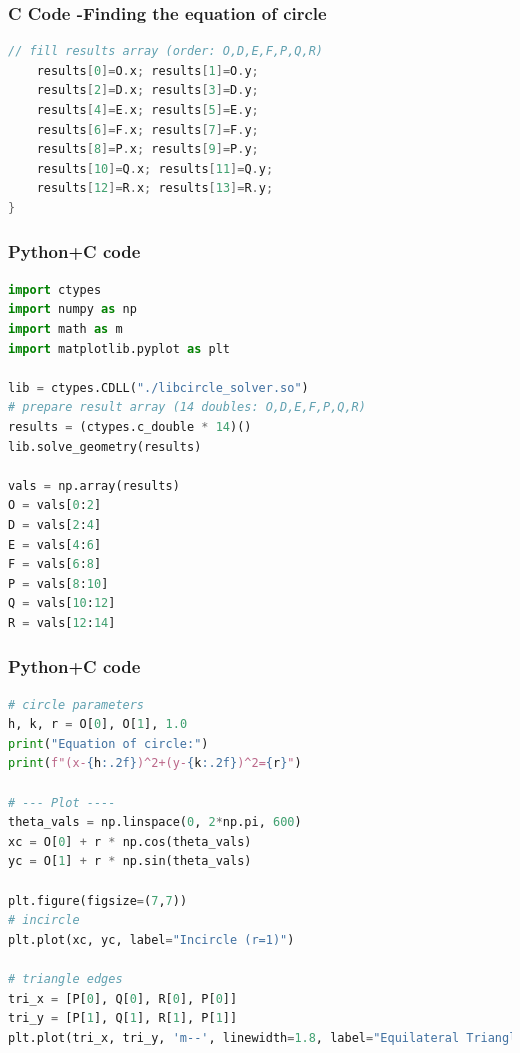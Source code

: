 \documentclass{beamer}
\begin{document}
\begin{frame}[fragile]
    \frametitle{C Code -Finding the equation of circle}

    \begin{lstlisting}[language=C]
    // fill results array (order: O,D,E,F,P,Q,R)
    results[0]=O.x; results[1]=O.y;
    results[2]=D.x; results[3]=D.y;
    results[4]=E.x; results[5]=E.y;
    results[6]=F.x; results[7]=F.y;
    results[8]=P.x; results[9]=P.y;
    results[10]=Q.x; results[11]=Q.y;
    results[12]=R.x; results[13]=R.y;
}

    \end{lstlisting}
\end{frame}


\begin{frame}[fragile]
    \frametitle{Python+C code}

    \begin{lstlisting}[language=Python]
import ctypes
import numpy as np
import math as m
import matplotlib.pyplot as plt

lib = ctypes.CDLL("./libcircle_solver.so")
# prepare result array (14 doubles: O,D,E,F,P,Q,R)
results = (ctypes.c_double * 14)()
lib.solve_geometry(results)

vals = np.array(results)
O = vals[0:2]
D = vals[2:4]
E = vals[4:6]
F = vals[6:8]
P = vals[8:10]
Q = vals[10:12]
R = vals[12:14]

    \end{lstlisting}
\end{frame}

\begin{frame}[fragile]
    \frametitle{Python+C code}

    \begin{lstlisting}[language=Python]
# circle parameters
h, k, r = O[0], O[1], 1.0
print("Equation of circle:")
print(f"(x-{h:.2f})^2+(y-{k:.2f})^2={r}")

# --- Plot ----
theta_vals = np.linspace(0, 2*np.pi, 600)
xc = O[0] + r * np.cos(theta_vals)
yc = O[1] + r * np.sin(theta_vals)

plt.figure(figsize=(7,7))
# incircle
plt.plot(xc, yc, label="Incircle (r=1)")

# triangle edges
tri_x = [P[0], Q[0], R[0], P[0]]
tri_y = [P[1], Q[1], R[1], P[1]]
plt.plot(tri_x, tri_y, 'm--', linewidth=1.8, label="Equilateral Triangle")



    \end{lstlisting}
\end{frame}
\end{document}
